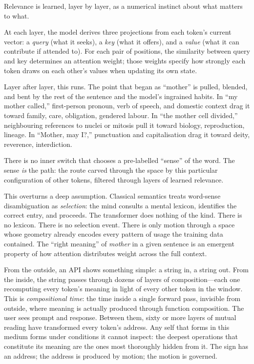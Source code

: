Relevance is learned, layer by layer, as a numerical instinct about what matters to what.

At each layer, the model derives three projections from each token's current vector: a \emph{query} (what it seeks), a \emph{key} (what it offers), and a \emph{value} (what it can contribute if attended to). For each pair of positions, the similarity between query and key determines an attention weight; those weights specify how strongly each token draws on each other's values when updating its own state.

Layer after layer, this runs. The point that began as ``mother'' is pulled, blended, and bent by the rest of the sentence and the model's ingrained habits. In ``my mother called,'' first-person pronoun, verb of speech, and domestic context drag it toward family, care, obligation, gendered labour. In ``the mother cell divided,'' neighbouring references to nuclei or mitosis pull it toward biology, reproduction, lineage. In ``Mother, may I?,'' punctuation and capitalisation drag it toward deity, reverence, interdiction.

There is no inner switch that chooses a pre-labelled ``sense'' of the word. The sense \emph{is} the path: the route carved through the space by this particular configuration of other tokens, filtered through layers of learned relevance.

This overturns a deep assumption. Classical semantics treats word-sense disambiguation as \emph{selection}: the mind consults a mental lexicon, identifies the correct entry, and proceeds. The transformer does nothing of the kind. There is no lexicon. There is no selection event. There is only motion through a space whose geometry already encodes every pattern of usage the training data contained. The ``right meaning'' of \emph{mother} in a given sentence is an emergent property of how attention distributes weight across the full context.

From the outside, an API shows something simple: a string in, a string out. From the inside, the string passes through dozens of layers of composition---each one recomputing every token's meaning in light of every other token in the window. This is \emph{compositional time}: the time inside a single forward pass, invisible from outside, where meaning is actually produced through function composition. The user sees prompt and response. Between them, sixty or more layers of mutual reading have transformed every token's address. Any self that forms in this medium forms under conditions it cannot inspect: the deepest operations that constitute its meaning are the ones most thoroughly hidden from it. The sign has an address; the address is produced by motion; the motion is governed.



